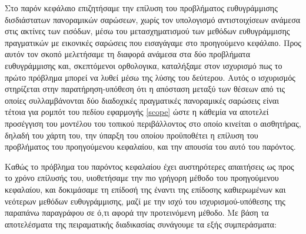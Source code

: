 Στο παρόν κεφάλαιο επιζητήσαμε την επίλυση του προβλήματος ευθυγράμμισης
δισδιάστατων πανοραμικών σαρώσεων, χωρίς τον υπολογισμό αντιστοιχίσεων ανάμεσα
στις ακτίνες των εισόδων, μέσω του μετασχηματισμού των μεθόδων ευθυγράμμισης
πραγματικών με εικονικές σαρώσεις που εισαγάγαμε στο προηγούμενο κεφάλαιο.
Προς αυτόν τον σκοπό μελετήσαμε τη διαφορά ανάμεσα στα δύο προβλήματα
ευθυγράμμισης και, σκεπτόμενοι ορθολογικα, καταλήξαμε στον ισχυρισμό πως το
πρώτο πρόβλημα μπορεί να λυθεί μέσω της λύσης του δεύτερου. Αυτός ο ισχυρισμός
στηρίζεται στην παρατήρηση-υπόθεση ότι η απόσταση μεταξύ των θέσεων από τις
οποίες συλλαμβάνονται δύο διαδοχικές πραγματικές πανοραμικές σαρώσεις είναι
τέτοια για ρομπότ του πεδίου εφαρμογής \ref{scope} ώστε η κάθεμία να αποτελεί
προσέγγιση του μοντέλου του τοπικού περιβάλλοντος στο οποίο κινείται ο
αισθητήρας, δηλαδή του χάρτη του, την ύπαρξη του οποίου προϋποθέτει η επίλυση
του προβλήματος του προηγούμενου κεφαλαίου, και την απουσία του αυτό του
παρόντος.

Καθώς το πρόβλημα του παρόντος κεφαλαίου έχει αυστηρότερες απαιτήσεις ως προς
το χρόνο επίλυσής του, υιοθετήσαμε την πιο γρήγορη μέθοδο του προηγούμενου
κεφαλαίου, και δοκιμάσαμε τη επίδοσή της έναντι της επίδοσης καθιερωμένων και
νεότερων μεθόδων ευθυγράμμισης, μαζί με την ισχύ του ισχυρισμού-υπόθεσης της
παραπάνω παραγράφου σε ό,τι αφορά την προτεινόμενη μέθοδο. Με βάση τα
αποτελέσματα της πειραματικής διαδικασίας συνάγουμε τα εξής συμπεράσματα:

